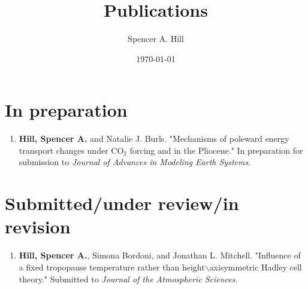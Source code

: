 \documentclass[12pt,letterpaper]{shillcv}
\author{Spencer A. Hill}
\date{\today}
\title{Publications}
\begin{document}
\maketitle


\section*{In preparation}
\label{sec:orgf576c41}
\begin{enumerate}
\item \textbf{Hill, Spencer A.} and Natalie J. Burls.  "Mechanisms of poleward energy
transport changes under CO\(_2\) forcing and in the Pliocene."  In
preparation for submission to \emph{Journal of Advances in Modeling Earth
Systems}.
\end{enumerate}
\section*{Submitted/under review/in revision}
\label{sec:org49f4d26}
\begin{enumerate}
\item \textbf{Hill, Spencer A.}, Simona Bordoni, and Jonathan L. Mitchell.  "Influence of
a fixed tropopause temperature rather than height$\backslash$\on axisymmetric Hadley
cell theory."  Submitted to \emph{Journal of the Atmospheric Sciences}.
\end{enumerate}
\end{document}
